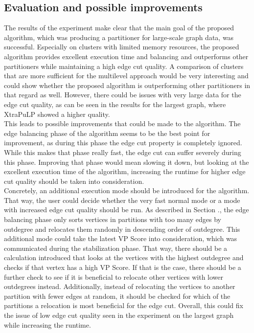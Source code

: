 \documentclass[acmsmall,nonacm,screen,review]{acmart}
\begin{document}
\subsection{Evaluation and possible improvements}
The results of the experiment make clear that the main goal of the proposed algorithm, which was producing a partitioner for large-scale graph data, was successful. Especially on clusters with limited memory resources, the proposed algorithm provides excellent execution time and balancing and outperforms other partitioners while maintaining a high edge cut quality. A comparison of clusters that are more sufficient for the multilevel approach would be very interesting and could show whether the proposed algorithm is outperforming other partitioners in that regard as well. However, there could be issues with very large data for the edge cut quality, as can be seen in the results for the largest graph, where XtraPuLP showed a higher quality. \\
This leads to possible improvements that could be made to the algorithm. The edge balancing phase of the algorithm seems to be the best point for improvement, as during this phase the edge cut property is completely ignored. While this makes that phase really fast, the edge cut can suffer severely during this phase. Improving that phase would mean slowing it down, but looking at the excellent execution time of the algorithm, increasing the runtime for higher edge cut quality should be taken into consideration. \\
Concretely, an additional execution mode should be introduced for the algorithm. That way, the user could decide whether the very fast normal mode or a mode with increased edge cut quality should be run. As described in Section ., the edge balancing phase only sorts vertices in partitions with too many edges by outdegree and relocates them randomly in descending order of outdegree. This additional mode could take the latest VP Score into consideration, which was communicated during the stabilization phase. That way, there should be a calculation introduced that looks at the vertices with the highest outdegree and checks if that vertex has a high VP Score. If that is the case, there should be a further check to see if it is beneficial to relocate other vertices with lower outdegrees instead. Additionally, instead of relocating the vertices to another partition with fewer edges at random, it should be checked for which of the partitions a relocation is most beneficial for the edge cut. Overall, this could fix the issue of low edge cut quality seen in the experiment on the largest graph while increasing the runtime. 
\end{document}
